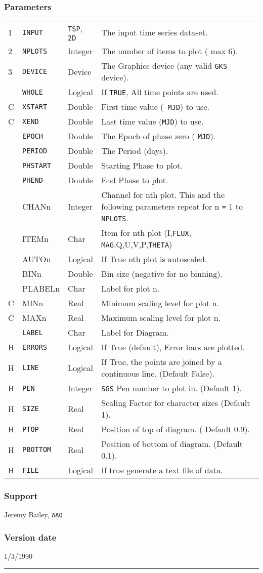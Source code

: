 \documentclass[11pt,twoside,nolof,noabs]{starlink}
\newenvironment{manroutinedescription}{}{\par{}\rule{\textwidth}{0.5mm}}
\newcommand{\manroutineitem}[2]{\subsubsection*{#1}#2\par{}}
\newenvironment{manparametertable}{\begin{tabular}{lllp{80mm}}}%
{\end{tabular}}
\newcommand{\manparameterentry}[3]{\\#1 & #2 & #3 & }
\providecommand{\mantt}[1]{\texttt{#1}}
\begin{document}
\begin{manroutinedescription}
\manroutineitem{Parameters}{}
\begin{manparametertable}
\manparameterentry{1}{{\mantt{INPUT}}}{{\mantt{TSP}}, {\mantt{2D}}}  The input %
time series dataset.
\manparameterentry{2}{{\mantt{NPLOTS}}}{Integer}  The number of items to plot (%
max 6).
\manparameterentry{3}{{\mantt{DEVICE}}}{Device}   The Graphics device (any %
valid {\mantt{GKS}} device).
\manparameterentry{}{{\mantt{WHOLE}}}{Logical}  If {\mantt{TRUE}}, All time %
points are used.
\manparameterentry{C}{{\mantt{XSTART}}}{Double}   First time value ({\mantt{%
MJD}}) to use.
\manparameterentry{C}{{\mantt{XEND}}}{Double}   Last time value ({\mantt{MJD}}) %
to use.
\manparameterentry{}{{\mantt{EPOCH}}}{Double}   The Epoch of phase zero ({%
\mantt{MJD}}).
\manparameterentry{}{{\mantt{PERIOD}}}{Double}   The Period (days).
\manparameterentry{}{{\mantt{PHSTART}}}{Double}   Starting Phase to plot.
\manparameterentry{}{{\mantt{PHEND}}}{Double}   End Phase to plot.
\manparameterentry{}{CHANn}{Integer}  Channel for nth plot. This and the
                               following parameters repeat for
                               n {\mantt{=}} 1 to {\mantt{NPLOTS}}.
\manparameterentry{}{ITEMn}{Char}     Item for nth plot (I,{\mantt{FLUX}},{%
\mantt{MAG}},Q,U,V,P,{\mantt{THETA}})
\manparameterentry{}{AUTOn}{Logical}  If True nth plot is autoscaled.
\manparameterentry{}{BINn}{Double}   Bin size (negative for no binning).
\manparameterentry{}{PLABELn}{Char}     Label for plot n.
\manparameterentry{C}{MINn}{Real}     Minimum scaling level for plot n.
\manparameterentry{C}{MAXn}{Real}     Maximum scaling level for plot n.
\manparameterentry{}{{\mantt{LABEL}}}{Char}     Label for Diagram.
\manparameterentry{H}{{\mantt{ERRORS}}}{Logical}  If True (default), Error %
bars are plotted.
\manparameterentry{H}{{\mantt{LINE}}}{Logical}  If True, the points are joined %
by a
                               continuous line. (Default False).
\manparameterentry{H}{{\mantt{PEN}}}{Integer}  {\mantt{SGS}} Pen number to %
plot in. (Default 1).
\manparameterentry{H}{{\mantt{SIZE}}}{Real}     Scaling Factor for character %
sizes (Default 1).
\manparameterentry{H}{{\mantt{PTOP}}}{Real}     Position of top of diagram. (%
Default 0.9).
\manparameterentry{H}{{\mantt{PBOTTOM}}}{Real}     Position of bottom of %
diagram. (Default 0.1).
\manparameterentry{H}{{\mantt{FILE}}}{Logical}  If true generate a text file %
of data.

\end{manparametertable}
\manroutineitem{Support}{Jeremy Bailey, {\mantt{AAO}}}
\manroutineitem{Version date}{1/3/1990}
\end{manroutinedescription}
\end{document}
